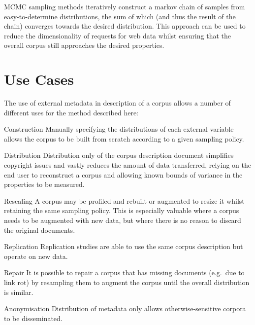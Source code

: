 MCMC sampling methods iteratively construct a markov chain of samples from easy-to-determine distributions, the sum of which (and thus the result of the chain) converges towards the desired distribution.  This approach can be used to reduce the dimensionality of requests for web data whilst ensuring that the overall corpus still approaches the desired properties.
     


\section{Use Cases}
\label{sec:rebuilding:rationale:usecases}
The use of external metadata in description of a corpus allows a number of different uses for the method described here:


\begin{itemizeTitle}
    \item[Construction] Manually specifying the distributions of each external variable allows the corpus to be built from scratch according to a given sampling policy.

    \item[Distribution] Distribution only of the corpus description document simplifies copyright issues and vastly reduces the amount of data transferred, relying on the end user to reconstruct a corpus and allowing known bounds of variance in the properties to be measured.

    \item[Rescaling] A corpus may be profiled and rebuilt or augmented to resize it whilst retaining the same sampling policy.  This is especially valuable where a corpus needs to be augmented with new data, but where there is no reason to discard the original documents.

    \item[Replication] Replication studies are able to use the same corpus description but operate on new data.

    \item[Repair] It is possible to repair a corpus that has missing documents (e.g.\ due to link rot) by resampling them to augment the corpus until the overall distribution is similar.

    \item[Anonymisation] Distribution of metadata only allows otherwise-sensitive corpora to be disseminated.
\end{itemizeTitle}




